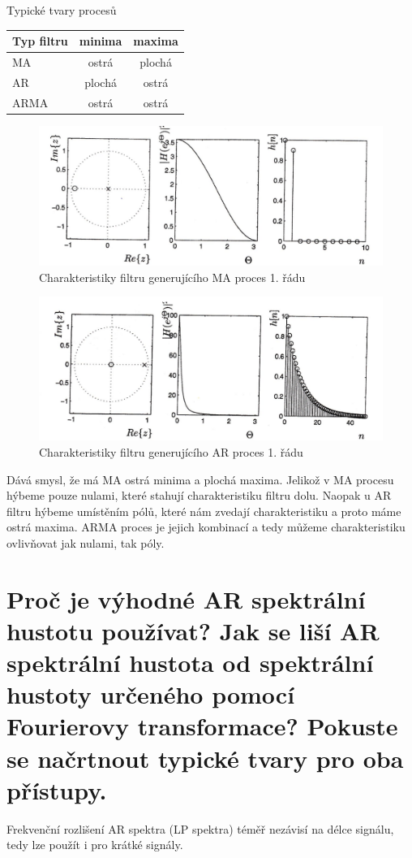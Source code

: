 \documentclass[a4paper,12pt]{article}   %
\begin{document}

Typické tvary procesů
\begin{table}[h!]
        \centering
        \begin{tabular}{|l|c|c|}
                \hline
                Typ filtru & minima & maxima \\\hline\hline
                MA & ostrá & plochá \\\hline
                AR & plochá & ostrá \\\hline
                ARMA & ostrá & ostrá\\\hline
        \end{tabular}
\end{table}

\begin{figure}[h!]
        \centering
        \includegraphics[width=.6\textwidth]{fig/MA_filter.png}
        \caption*{Charakteristiky filtru generujícího MA proces 1. řádu}
        \label{fig:MA:filter}
\end{figure}

\begin{figure}[h!]
        \centering
        \includegraphics[width=.6\textwidth]{fig/AR_filter.png}
        \caption*{Charakteristiky filtru generujícího AR proces 1. řádu}
        \label{fig:AR:filter}
\end{figure}
\FloatBarrier

Dává smysl, že má MA ostrá minima a plochá maxima. Jelikož v MA procesu hýbeme pouze nulami, které stahují charakteristiku filtru dolu. Naopak u AR filtru hýbeme umístěním pólů, které nám zvedají charakteristiku a proto máme ostrá maxima. ARMA proces je jejich kombinací a tedy můžeme charakteristiku ovlivňovat jak nulami, tak póly. 


\section{Proč je výhodné AR spektrální hustotu používat? Jak se liší AR spektrální hustota od spektrální hustoty určeného pomocí Fourierovy transformace? Pokuste se načrtnout typické tvary pro oba přístupy.}
Frekvenční rozlišení AR spektra (LP spektra) téměř nezávisí na délce signálu, tedy lze použít i pro krátké signály. 
\end{document}
